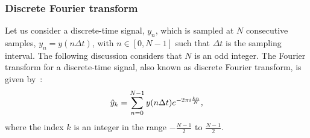 \subsubsection*{Discrete Fourier transform} %
Let us consider a discrete-time signal, $y_n$, which is sampled at $N$ consecutive samples, $y_n = y(n \Delta t)$, with $n \in \left[0,N-1 \right ]$ such that $\Delta t$ is the sampling interval. The following discussion considers that $N$ is an odd integer. The Fourier transform for a discrete-time signal, also known as discrete Fourier transform, is given by~\cite{a_numerical_recipies}:%
\begin{equation}\label{eq:DFT_definiton}
    \hat{y}_k= \sum_{n=0}^{N-1} y(n\Delta t) e^{-2\pi {i} \frac{k n}{N}},
\end{equation}
where the index $k$ is an integer in the range $-\frac{N-1}{2}$ to $\frac{N-1}{2}$.




